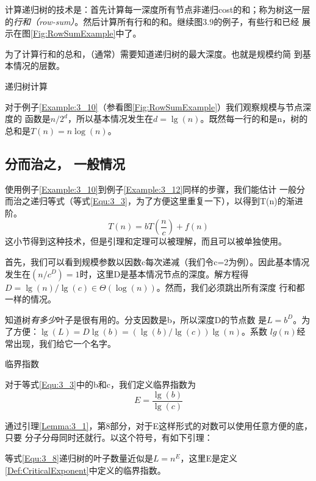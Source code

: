 计算递归树的技术是：首先计算每一深度所有节点非递归cost的和；称为树这一层
的\emph{行和（row-sum）}。然后计算所有行和的和。继续图3.9的例子，有些行和已经
展示在图\ref{Fig:RowSumExample}中了。

为了计算行和的总和，（通常）需要知道递归树的最大深度。也就是规模约简
到基本情况的层数。

\begin{example}\label{Example:3_12}
递归树计算

对于例子\ref{Example:3_10}（参看图\ref{Fig:RowSumExample}）我们观察规模与节点深度的
函数是$n/2^d$，所以基本情况发生在$d=\lg(n)$。既然每一行的和是n，树的
总和是$T(n)=n\log(n)$。
\end{example}

\subsection{分而治之， 一般情况}
使用例子\ref{Example:3_10}到例子\ref{Example:3_12}同样的步骤，我们能估计
一般分而治之递归等式（等式\ref{Equ:3_3}，为了方便这里重复一下），以得到T(n)的渐进阶。
\begin{equation}\label{Equ:3_8}
T(n)=bT(\frac{n}{c})+f(n)
\end{equation}
这小节得到这种技术，但是引理和定理可以被理解，而且可以被单独使用。

首先，我们可以看到规模参数以因数c每次递减（我们令c=2为例）。因此基本情况
发生在$(n/c^D)=1$时，这里D是基本情况节点的深度。解方程得
$D=\lg(n)/\lg(c)\in \Theta(\log(n))$。然而，我们必须跳出所有深度
行和都一样的情况。

知道树\emph{有多少}叶子是很有用的。分支因数是b，所以深度D的节点数
是$L=b^D$。为了方便：$\lg(L)=D\lg(b)=(\lg(b)/\lg(c))\lg(n)$。系数
$lg(n)$经常出现，我们给它一个名字。

\begin{definition}\label{Def:CriticalExponent}
临界指数

对于等式\ref{Equ:3_3}中的b和c，我们定义临界指数为
\begin{displaymath}
E=\frac{\lg(b)}{\lg(c)}
\end{displaymath}
\end{definition}

通过引理\ref{Lemma:3_1}，第8部分，对于E这样形式的对数可以使用任意方便的底，只要
分子分母同时还就行。以这个符号，有如下引理：

\begin{lemma}
等式\ref{Equ:3_8}递归树的叶子数量近似是$L=n^E$，这里E是定义
\ref{Def:CriticalExponent}中定义的临界指数。
\end{lemma}


